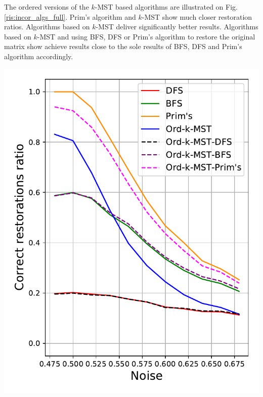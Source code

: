 \documentclass[11pt, tightenlines, twoside, onecolumn, nofloats, nobibnotes, nofootinbib, superscriptaddress, noshowpacks, centertags]{revtex4}
\begin{document}
The ordered versions of the $k$-MST based algorithms are illustrated on Fig. \ref{ris:incor_algs_full}. Prim's algorithm and $k$-MST show much closer restoration ratios. Algorithms based on $k$-MST deliver significantly better results. Algorithms based on $k$-MST and using BFS, DFS or Prim's algorithm to restore the original matrix show achieve results close to the sole results of BFS, DFS and Prim's algorithm accordingly. 

\begin{minipage}[B]{0.49\textwidth}
        \centering
        \includegraphics[scale=0.5]{img/incor_algs_local_alpha000_maxarity_5_20.pdf}
        \label{ris:incor_algs_local}
\end{minipage}
\hfill
\end{document}
